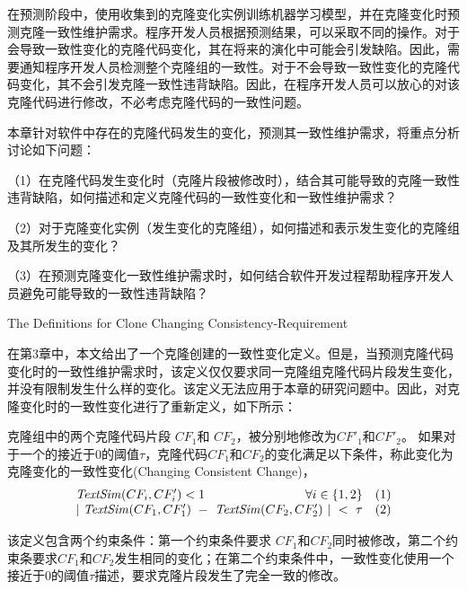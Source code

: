 在预测阶段中，使用收集到的克隆变化实例训练机器学习模型，并在克隆变化时预测克隆一致性维护需求。程序开发人员根据预测结果，可以采取不同的操作。对于会导致一致性变化的克隆代码变化，其在将来的演化中可能会引发缺陷。因此，需要通知程序开发人员检测整个克隆组的一致性。对于不会导致一致性变化的克隆代码变化，其不会引发克隆一致性违背缺陷。因此，在程序开发人员可以放心的对该克隆代码进行修改，不必考虑克隆代码的一致性问题。

本章针对软件中存在的克隆代码发生的变化，预测其一致性维护需求，将重点分析讨论如下问题：

（1）在克隆代码发生变化时（克隆片段被修改时），结合其可能导致的克隆一致性违背缺陷，如何描述和定义克隆代码的一致性变化和一致性维护需求？

（2）对于克隆变化实例（发生变化的克隆组），如何描述和表示发生变化的克隆组及其所发生的变化？

（3）在预测克隆变化一致性维护需求时，如何结合软件开发过程帮助程序开发人员避免可能导致的一致性违背缺陷？%


{The Definitions for Clone Changing Consistency-Requirement}

在第3章中，本文给出了一个克隆创建的一致性变化定义。但是，当预测克隆代码变化时的一致性维护需求时，该定义仅仅要求同一克隆组克隆代码片段发生变化，并没有限制发生什么样的变化。该定义无法应用于本章的研究问题中。因此，对克隆变化时的一致性变化进行了重新定义，如下所示：

\begin{definition}[克隆变化一致性变化]  
\label{def-changingchange}
克隆组中的两个克隆代码片段 $CF_1$和 $CF_2$，被分别地修改为$CF'_1$和$CF'_2$。  如果对于一个的接近于0的阈值$\tau$，克隆代码$CF_1$和$CF_2$的变化满足以下条件，称此变化为克隆变化的一致性变化(Changing Consistent Change)， 
  \[
  \begin{array}[t]{crl}
    \mathit{TextSim}(CF_i, CF'_i) < 1 & \forall i \in \{1,2\} &(1) \\
    \multicolumn{2}{c}{| ~\mathit{TextSim}(CF_1,CF'_1)  ~-~ \mathit{TextSim}(CF_2,CF'_2) ~| ~< ~ \tau}  & (2)
  \end{array}
  \]
\end{definition}

该定义包含两个约束条件：第一个约束条件要求 $CF_1 $和$CF_2 $同时被修改，第二个约束条要求$CF_1 $和$CF_2$发生相同的变化；在第二个约束条件中，一致性变化使用一个接近于0的阈值$\tau$描述，要求克隆片段发生了完全一致的修改。%

